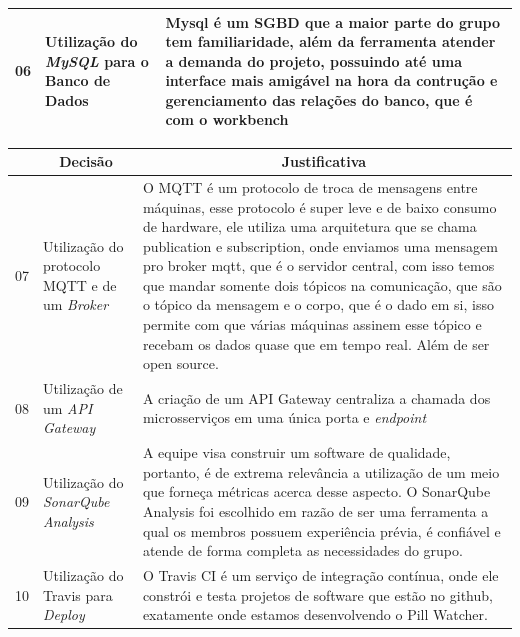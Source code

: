 \begin{apendicesenv}
\begin{table}[H]
\begin{adjustbox}{max width = 1\textwidth}
\begin{tabular}{|c|p{5cm}|p{10cm}|}
            \hline
            06 & Utilização do \textit{MySQL} para o Banco de Dados & Mysql é um SGBD que a maior parte do grupo tem familiaridade, além da ferramenta atender a demanda do projeto, possuindo até uma interface mais amigável na hora da contrução e gerenciamento das relações do banco, que é com o workbench \\ 
            \hline
        \end{tabular}
    \end{adjustbox}
\end{table}

\begin{table}[H]
    \centering
    \begin{adjustbox}{max width = \textwidth}
        \begin{tabular}{|c|p{5cm}|p{10cm}|}
            \hline
            \rowcolor[HTML]{A8DADC}
            \multicolumn{1}{|c}{\textbf{\#}} &
            \multicolumn{1}{|c}{\textbf{Decisão}} & \multicolumn{1}{|c|}{\textbf{Justificativa}} \\ 
            \hline
            07 & Utilização do protocolo MQTT e de um \textit{Broker} & O MQTT é um protocolo de troca de mensagens entre máquinas, esse protocolo é super leve e de baixo consumo de hardware, ele utiliza uma arquitetura que se chama publication e subscription, onde enviamos uma mensagem pro broker mqtt, que é o servidor central, com isso temos que mandar somente dois tópicos na comunicação, que são o tópico da mensagem e o corpo, que é o dado em si, isso permite com que várias máquinas assinem esse tópico e recebam os dados quase que em tempo real. Além de ser open source. \\ \hline
            08 & Utilização de um \textit{API Gateway} & A criação de um API Gateway centraliza a chamada dos microsserviços em uma única porta e \emph{endpoint}\\ 
            \hline
             09 & Utilização do \textit{SonarQube Analysis} & A equipe visa construir um software de qualidade, portanto, é de extrema relevância a utilização de um meio que forneça métricas acerca desse aspecto. O SonarQube Analysis foi escolhido em razão de ser uma ferramenta a qual os membros possuem experiência prévia, é confiável e atende de forma completa as necessidades do grupo. \\ 
            \hline
            10 & Utilização do Travis para \textit{Deploy} & O Travis CI é um serviço de integração contínua, onde ele constrói e testa projetos de software que estão no github, exatamente onde estamos desenvolvendo o Pill Watcher. \\ 

\end{tabular}
\end{adjustbox}
\end{table}
\end{apendicesenv}
